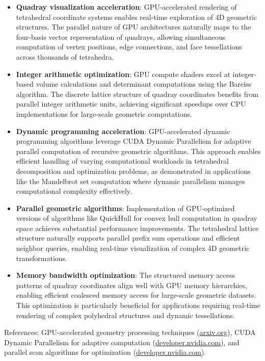 \documentclass[
  10pt,
]{article}
\providecommand{\tightlist}{%
  \setlength{\itemsep}{0pt}\setlength{\parskip}{0pt}}
\begin{document}
\begin{itemize}
\tightlist
\item
  \textbf{Quadray visualization acceleration}: GPU-accelerated rendering
  of tetrahedral coordinate systems enables real-time exploration of 4D
  geometric structures. The parallel nature of GPU architectures
  naturally maps to the four-basis vector representation of quadrays,
  allowing simultaneous computation of vertex positions, edge
  connections, and face tessellations across thousands of tetrahedra.
\item
  \textbf{Integer arithmetic optimization}: GPU compute shaders excel at
  integer-based volume calculations and determinant computations using
  the Bareiss algorithm. The discrete lattice structure of quadray
  coordinates benefits from parallel integer arithmetic units, achieving
  significant speedups over CPU implementations for large-scale
  geometric computations.
\item
  \textbf{Dynamic programming acceleration}: GPU-accelerated dynamic
  programming algorithms leverage CUDA Dynamic Parallelism for adaptive
  parallel computation of recursive geometric algorithms. This approach
  enables efficient handling of varying computational workloads in
  tetrahedral decomposition and optimization problems, as demonstrated
  in applications like the Mandelbrot set computation where dynamic
  parallelism manages computational complexity effectively.
\item
  \textbf{Parallel geometric algorithms}: Implementation of
  GPU-optimized versions of algorithms like QuickHull for convex hull
  computation in quadray space achieves substantial performance
  improvements. The tetrahedral lattice structure naturally supports
  parallel prefix sum operations and efficient neighbor queries,
  enabling real-time visualization of complex 4D geometric
  transformations.
\item
  \textbf{Memory bandwidth optimization}: The structured memory access
  patterns of quadray coordinates align well with GPU memory
  hierarchies, enabling efficient coalesced memory access for
  large-scale geometric datasets. This optimization is particularly
  beneficial for applications requiring real-time rendering of complex
  polyhedral structures and dynamic tessellations.
\end{itemize}

References: GPU-accelerated geometry processing techniques
(\href{https://arxiv.org/abs/1501.04706?utm_source=openai}{arxiv.org}),
CUDA Dynamic Parallelism for adaptive computation
(\href{https://developer.nvidia.com/blog/introduction-cuda-dynamic-parallelism/?utm_source=openai}{developer.nvidia.com}),
and parallel scan algorithms for optimization
(\href{https://developer.nvidia.com/gpugems/gpugems3/part-vi-gpu-computing?utm_source=openai}{developer.nvidia.com}).
\end{document}
